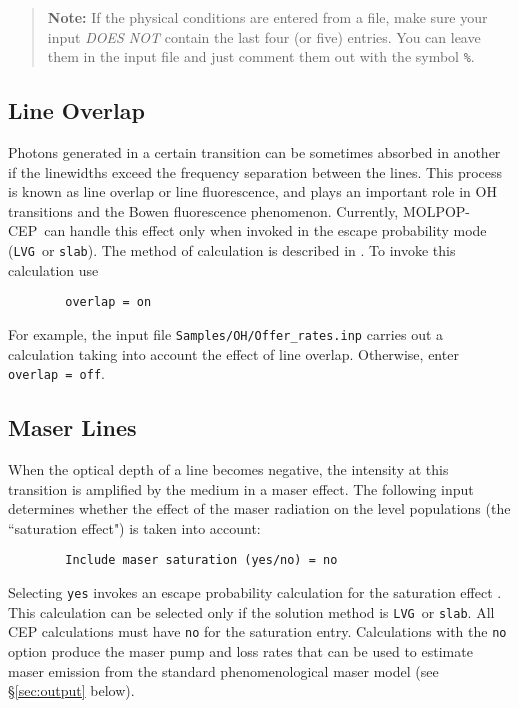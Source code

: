 \documentclass[12pt]{article}
\def\separation {0.5cm}
\def\M{MOLPOP-CEP}
\def\LVG      {\texttt{LVG}}
\def\slab     {\texttt{slab}}
\begin{document}
\begin{quote}
{\bf Note:} If the physical conditions are entered from a file, make sure your
input {\em DOES NOT} contain the last four (or five) entries. You can leave
them in the input file and just comment them out with the symbol {\tt \%}.
\end{quote}

\subsection{Line Overlap}
Photons generated in a certain transition can be sometimes absorbed in another
if the linewidths exceed the frequency separation between the lines. This
process is known as line overlap or line fluorescence, and plays an important
role in OH transitions and the Bowen fluorescence phenomenon. Currently, \M\
can handle this effect only when invoked in the escape probability mode (\LVG\
or \slab). The method of calculation is described in \cite{lockett_elitzur89}.
To invoke this calculation use \vspace{\separation}
\begin{verbatim}
        overlap = on
\end{verbatim}
For example, the input file \texttt{Samples/OH/Offer\_rates.inp} carries out a
calculation taking into account the effect of line overlap. Otherwise, enter
{\tt overlap = off}.


\subsection{Maser Lines}
When the optical depth of a line becomes negative, the intensity at this
transition is amplified by the medium in a maser effect. The following input
determines whether the effect of the maser radiation on the level populations
(the ``saturation effect") is taken into account:

\vspace{\separation}
\begin{verbatim}
        Include maser saturation (yes/no) = no
\end{verbatim}
Selecting {\tt yes} invokes an escape probability calculation for the
saturation effect \citep[see \S 5.3 in][]{elitzur92}. This calculation can be
selected only if the solution method is \LVG\ or \slab. All CEP calculations
must have {\tt no} for the saturation entry. Calculations with the {\tt no}
option produce the maser pump and loss rates that can be used to estimate maser
emission from the standard phenomenological maser model (see \S\ref{sec:output} below).
\end{document}
